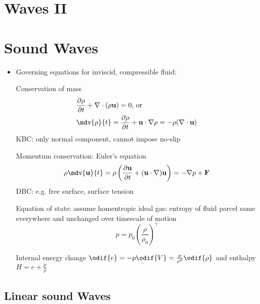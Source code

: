 


\section*{Waves \hfill II}

\section{Sound Waves}
\begin{itemize}
    \item Governing equations for inviscid, compressible fluid:
    
    Conservation of mass \begin{align*}
        &\pdv{\rho}{t} + \nabla\cdot(\rho\vec{u}) = 0 \text{, or }\\
        &\mdv{\rho}{t} = \pdv{\rho}{t} + \vec{u}\cdot\nabla\rho = -\rho (\nabla\cdot\vec{u})
    \end{align*}
    KBC: only normal component, cannot impose no-slip

    Momentum conservation: Euler's equation 
    \[\rho \mdv{\vec{u}}{t} = \rho \left( \pdv{\vec{u}}{t}  + (\vec{u} \cdot \nabla)\vec{u}  \right) = -\grad{p} + \vec{F} \]
    DBC: e.g. free surface, surface tension 

    Equation of state: assume homentropic ideal gas: entropy of fluid parcel same everywhere and unchanged over timescale of motion
    \[ p = p_0 \left(\frac{\rho}{\rho_0}\right)^\gamma\]

    Internal energy change $\odif{e} = -p \odif{V}= \frac{p}{\rho^2} \odif{\rho}$ and enthalpy $H=e+\frac{p}{\rho}$
\end{itemize}
\subsection*{Linear sound Waves}

